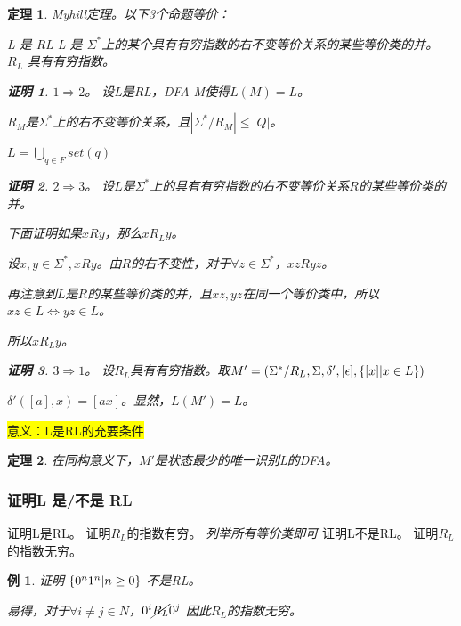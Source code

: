 \documentclass[twocolumn,zihao=5,linespread=1,heading=false,autoindent=0pt]{ctexart}
\DeclarePairedDelimiter{\set}{\{}{\}}
\newcommand{\hl}[1]{\colorbox{yellow}{#1}}
\theoremstyle{exampstyle} \newtheorem{definition}{定义}[section]
\theoremstyle{exampstyle} \newtheorem{example}{例}[section]
\theoremstyle{exampstyle} \newtheorem{theorem}{定理}[section]
\theoremstyle{exampstyle} \newtheorem{lemma}{引理}[section]
\theoremstyle{exampstyle} \newtheorem{myproof}{证明}[section]
\begin{document}
\begin{theorem}
    Myhill定理。以下3个命题等价：
    \begin{outline}[cenumerate]
        \1 L 是 RL
        \1 L 是 $\Sigma^*$上的某个具有有穷指数的右不变等价关系的某些等价类的并。
        \1 $R_L$ 具有有穷指数。
    \end{outline}

    \begin{myproof}
        $1 \Rightarrow 2$。 设L是RL，DFA M使得$L(M) = L$。

        $R_M$是$\Sigma^*$上的右不变等价关系，且$|\Sigma^* / R_M| \le |Q|$。

        $ L = \bigcup_{q \in F}set(q)$
    \end{myproof}

    \begin{myproof}
        $2 \Rightarrow 3$。 设$L$是$\Sigma^*$上的具有有穷指数的右不变等价关系$R$的某些等价类的并。

        下面证明如果$x R y$，那么$x R_L y$。

        设$x, y \in \Sigma^*, xRy$。由$R$的右不变性，对于$\forall z \in \Sigma^*$，$xzRyz$。

        再注意到$L$是$R$的某些等价类的并，且$xz,yz$在同一个等价类中，所以$xz \in L \iff yz \in L$。
        
        所以$x R_L y$。
    \end{myproof}

    \begin{myproof}
        $3 \Rightarrow 1$。 设$R_L$具有有穷指数。取$M' = (\Sigma^*/R_L, \Sigma, \delta', [\epsilon], \set{[x] | x \in L})$

        $\delta'([a], x) = [ax]$。显然，$L(M') = L$。
    \end{myproof}
\end{theorem}

\hl{意义：L是RL的充要条件}

\begin{theorem}
    在同构意义下，$M'$是状态最少的唯一识别L的DFA。
\end{theorem}

\subsubsection{证明L 是/不是 RL}
\begin{outline}[cenumerate]
    \1 证明L是RL。 证明$R_L$的指数有穷。 \emph{列举所有等价类即可}
    \1 证明L不是RL。 证明$R_L$的指数无穷。
\end{outline}
\begin{example}
    证明 $\set{0^n1^n | n \ge 0}$ 不是RL。

    易得，对于$\forall i \ne j \in N$，$0^i \cancel{R_L} 0^j$
    因此$R_L$的指数无穷。
\end{example}
\end{document}
